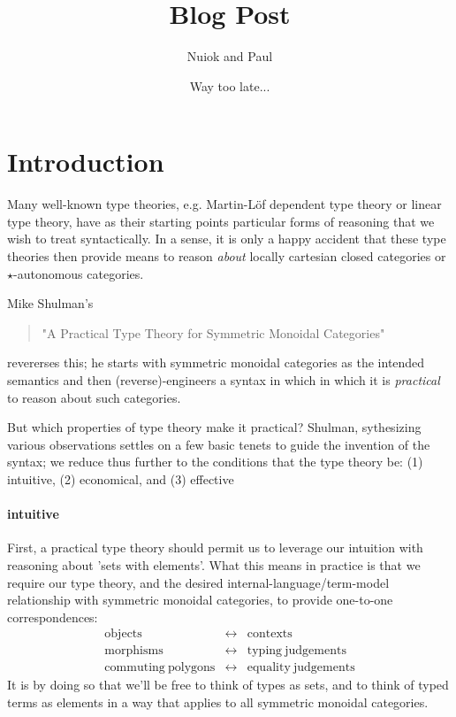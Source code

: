 \documentclass[pra,floatfix,
amsmath,superscriptaddress, 12pt]{article}
\title{Blog Post}
\author{Nuiok and Paul }
\date{Way too late...}
\theoremstyle{definition}
\begin{document}
\maketitle



\section{Introduction}

Many well-known type theories, e.g. Martin-L\"{o}f dependent type theory or linear type theory, have as their starting points particular forms of reasoning that we wish to treat syntactically. In a sense, it is only a happy accident that these type theories then provide means to reason \emph{about} locally cartesian closed categories or $\star$-autonomous categories.

Mike Shulman's 
\begin{quotation}
    "A Practical Type Theory for Symmetric Monoidal Categories"
\end{quotation}
revererses this; he starts with symmetric monoidal categories as the intended semantics and then (reverse)-engineers a syntax in which in which it is \emph{practical} to reason about such categories.

But which properties of type theory make it practical? Shulman, sythesizing various observations settles on a few basic tenets to guide the invention of the syntax; we reduce thus further to the conditions that the type theory be: (1) intuitive, (2) economical, and (3) effective

\paragraph{intuitive} First, a practical type theory should permit us to leverage our intuition with reasoning about 'sets with elements'. What this means in practice is that we require our type theory, and the desired internal-language/term-model relationship with symmetric monoidal categories, to provide one-to-one correspondences:
\begin{eqnarray*}
\mathrm{objects}                & \longleftrightarrow & \mathrm{contexts}\\
\mathrm{morphisms}              & \longleftrightarrow & \mathrm{typing\ judgements}\\
\mathrm{commuting\ polygons}     & \longleftrightarrow & \mathrm{equality\ judgements}
\end{eqnarray*}
It is by doing so that we'll be free to think of types as sets, and to think of typed terms as elements in a way that applies to all symmetric monoidal categories.
\end{document}
